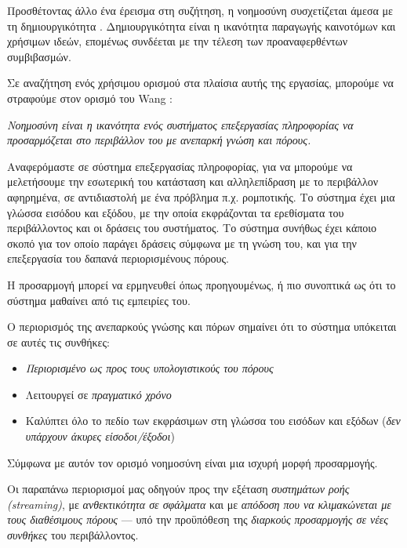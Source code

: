   Προσθέτοντας άλλο ένα έρεισμα στη συζήτηση, η νοημοσύνη συσχετίζεται άμεσα με τη δημιουργικότητα \parencite{benedekIntelligenceCreativityCognitive2014}.
  Δημιουργικότητα είναι η ικανότητα παραγωγής καινοτόμων και χρήσιμων ιδεών,
  επομένως συνδέεται με την τέλεση των προαναφερθέντων συμβιβασμών.
  \bigskip

  Σε αναζήτηση ενός χρήσιμου ορισμού στα πλαίσια αυτής της εργασίας, μπορούμε να στραφούμε στον ορισμό του Wang \cite{wangWorkingDefinitionIntelligence1995}:

  \begin{displayquote}
    \textit{Νοημοσύνη είναι η ικανότητα ενός συστήματος επεξεργασίας πληροφορίας να προσαρμόζεται
    στο περιβάλλον του με ανεπαρκή γνώση και πόρους.}
  \end{displayquote}

  Αναφερόμαστε σε σύστημα επεξεργασίας πληροφορίας, για να μπορούμε να μελετήσουμε την εσωτερική του κατάσταση και αλληλεπίδραση
  με το περιβάλλον αφηρημένα, σε αντιδιαστολή με ένα πρόβλημα π.χ. ρομποτικής.
  Το σύστημα έχει μια γλώσσα εισόδου και εξόδου, με την οποία εκφράζονται τα ερεθίσματα του περιβάλλοντος και οι δράσεις του συστήματος.
  Το σύστημα συνήθως έχει κάποιο σκοπό για τον οποίο παράγει δράσεις σύμφωνα με τη γνώση του,
  και για την επεξεργασία του δαπανά περιορισμένους πόρους.

  Η προσαρμογή μπορεί να ερμηνευθεί όπως προηγουμένως, ή πιο συνοπτικά ως ότι το σύστημα μαθαίνει από τις εμπειρίες του.

  Ο περιορισμός της ανεπαρκούς γνώσης και πόρων σημαίνει ότι το σύστημα υπόκειται σε αυτές τις συνθήκες:
  \begin{itemize}
    \item \textit{Περιορισμένο ως προς τους υπολογιστικούς του πόρους}
    \item Λειτουργεί σε \textit{πραγματικό χρόνο}
    \item Καλύπτει όλο το πεδίο των εκφράσιμων στη γλώσσα του εισόδων και εξόδων (\textit{δεν υπάρχουν άκυρες είσοδοι/έξοδοι})
  \end{itemize}

  Σύμφωνα με αυτόν τον ορισμό νοημοσύνη είναι μια ισχυρή μορφή προσαρμογής.

  Οι παραπάνω περιορισμοί μας οδηγούν προς την εξέταση \textit{συστημάτων ροής (streaming)}, με \textit{ανθεκτικότητα σε σφάλματα}
  και με \textit{απόδοση που να κλιμακώνεται με τους διαθέσιμους πόρους} --- υπό την προϋπόθεση της \textit{διαρκούς προσαρμογής σε νέες συνθήκες} του περιβάλλοντος.

